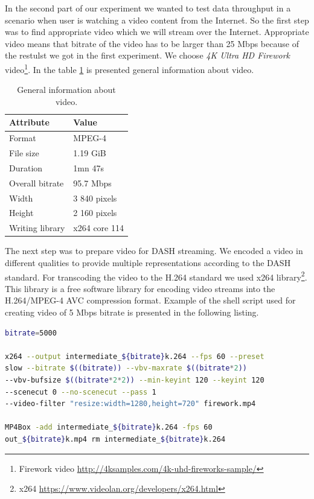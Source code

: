\documentclass{llncs}
\begin{document}
In the second part of our experiment we wanted to test data throughput in a scenario when user is watching a video content from the Internet. So the first step was to find appropriate video which we will stream over the Internet. Appropriate video means that bitrate of the video has to be larger than 25 Mbps because of the  restulst we got in the first experiment. We choose \emph{4K Ultra HD Firework }video\footnote{Firework video \url{http://4ksamples.com/4k-uhd-fireworks-sample/}}. In the table \ref{tab:video} is presented general information about video. 

\begin{table}
\centering
\begin{tabular}{l|l}
Attribute & Value \\\hline
Format & MPEG-4 \\
File size & 1.19 GiB \\
Duration & 1mn 47s \\ 
Overall bitrate & 95.7 Mbps \\
Width & 3 840 pixels \\
Height & 2 160 pixels \\
Writing library \hspace{10mm}  &  x264 core 114 \\
\end{tabular}
\caption{\label{tab:video}General information about video.}
\end{table}

The next step was to prepare video for DASH streaming. We encoded a video in different qualities to provide multiple representations according to the DASH standard. For transcoding the video to the H.264 standard we used x264 library\footnote{x264 \url{https://www.videolan.org/developers/x264.html}}. This library is a free software library for encoding video streams into the H.264/MPEG-4 AVC compression format. Example of the shell script used for creating video of 5 Mbps bitrate is presented in the following listing.

\begin{lstlisting}[language=bash, caption={\label{l:script}Shell script for encoding the video.}, captionpos=b]
bitrate=5000

x264 --output intermediate_${bitrate}k.264 --fps 60 --preset
slow --bitrate $((bitrate)) --vbv-maxrate $((bitrate*2)) 
--vbv-bufsize $((bitrate*2*2)) --min-keyint 120 --keyint 120 
--scenecut 0 --no-scenecut --pass 1 
--video-filter "resize:width=1280,height=720" firework.mp4

MP4Box -add intermediate_${bitrate}k.264 -fps 60
out_${bitrate}k.mp4 rm intermediate_${bitrate}k.264

\end{lstlisting} 
\end{document}
